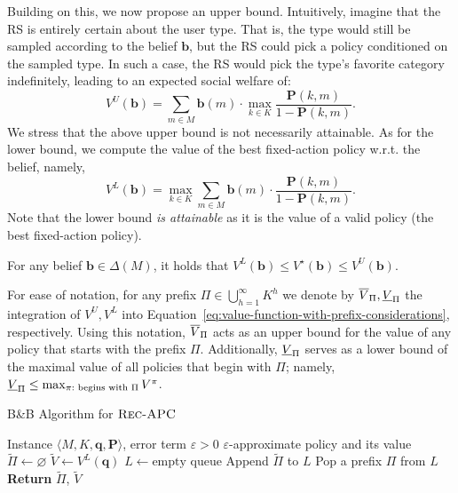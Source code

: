 Building on this, we now propose an upper bound. Intuitively, imagine that the RS is entirely certain about the user type. That is, the type would still be sampled according to the belief $\bm b$, but the RS could pick a policy conditioned on the sampled type. In such a case, the RS would pick the type's favorite category indefinitely, leading to an expected social welfare of:
\[
  V^U(\bm{b}) = \sum_{m \in M} \bm{b}(m) \cdot \max_{k \in K} \frac{\bm{P}(k, m)}{1 - \bm{P}(k, m)}.
\]
We stress that the above upper bound is not necessarily attainable. As for the lower bound, we compute the value of the best fixed-action policy w.r.t. the belief, namely,
\[
  V^L(\bm{b}) = \max_{k \in K} \sum_{m \in M} \bm{b}(m) \cdot \frac{\bm{P}(k, m)}{1 - \bm{P}(k, m)}.
\]
Note that the lower bound \emph{is attainable} as it is the value of a valid policy (the best fixed-action policy). 
\begin{lemma} \label{lemma:upper-lower-bound}
  For any belief $\bm b \in \Delta(M)$, it holds that $    V^L(\bm b) \leq V^\star(\bm b) \leq V^U(\bm b)$.
  
\end{lemma}
For ease of notation, for any prefix $\Pi \in \bigcup_{h=1}^{\infty} K^h$ we denote by $\overline{V}_\Pi, \underline{V}_\Pi$ the integration of $V^U, V^L$ into Equation~\eqref{eq:value-function-with-prefix-considerations}, respectively. Using this notation, $\overline{V}_\Pi$ acts as an upper bound for the value of any policy that starts with the prefix $\Pi$. Additionally, $\underline{V}_\Pi$ serves as a lower bound of the maximal value of all policies that begin with $\Pi$; namely, $\underline{V}_\Pi \leq \max_{\pi:\text{ begins with }\Pi} V^\pi$. 
\begin{algorithm}[t]
  \caption{B\&B Algorithm for $\textsc{Rec-APC}$}
  \label{bb-algorithm}
  \begin{algorithmic}[1]
    \REQUIRE Instance $\langle M, K, \bm{q}, \bm{P} \rangle$, error term $\varepsilon > 0$
    \ENSURE $\varepsilon$-approximate policy and its value
    \STATE $\tilde \Pi \gets \varnothing$  \label{bnbalg:empty_prefix}
    \STATE $\tilde V \gets V^{L}(\bm{q})$ 
    \STATE $L \gets \text{empty queue}$
    \STATE Append $\tilde \Pi$ to $L$
    \STATE Pop a prefix $\Pi$ from $L$
     
    \ENDFOR
    \ENDWHILE
    \STATE \textbf{Return} $\tilde \Pi$, $\tilde V$
  \end{algorithmic}
\end{algorithm}

